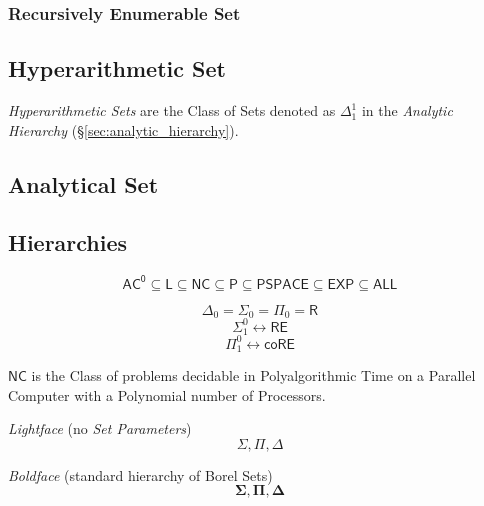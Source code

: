 \subsubsection{Recursively Enumerable Set}\label{sec:recursively_enumerable}



\subsection{Hyperarithmetic Set}\label{sec:hyperarithmetic_set}

\emph{Hyperarithmetic Sets} are the Class of Sets denoted as
$\Delta^1_1$ in the \emph{Analytic Hierarchy}
(\S\ref{sec:analytic_hierarchy}).



\subsection{Analytical Set}\label{sec:analytical_set}



\subsection{Hierarchies}\label{sec:complexity_hierarchy}

\[
  \mathsf{AC^0} \subseteq \mathsf{L} \subseteq \mathsf{NC} \subseteq
  \mathsf{P} \subseteq \mathsf{PSPACE} \subseteq \mathsf{EXP}
  \subseteq \mathsf{ALL}
\]

\[
  \Delta_0 = \Sigma_0 = \Pi_0 = \mathsf{R}
\]\[
  \Sigma_1^0 \leftrightarrow \mathsf{RE}
\]\[
  \Pi_1^0 \leftrightarrow \mathsf{coRE}
\]

\emph{$\mathsf{NC}$} is the Class of problems decidable in
Polyalgorithmic Time on a Parallel Computer with a Polynomial number
of Processors.

\emph{Lightface} (no \emph{Set Parameters}) %
\[
  \Sigma, \Pi, \Delta
\]

\emph{Boldface} (standard hierarchy of Borel Sets)
\[
  \mathbf{\Sigma}, \mathbf{\Pi}, \mathbf{\Delta}
\]

